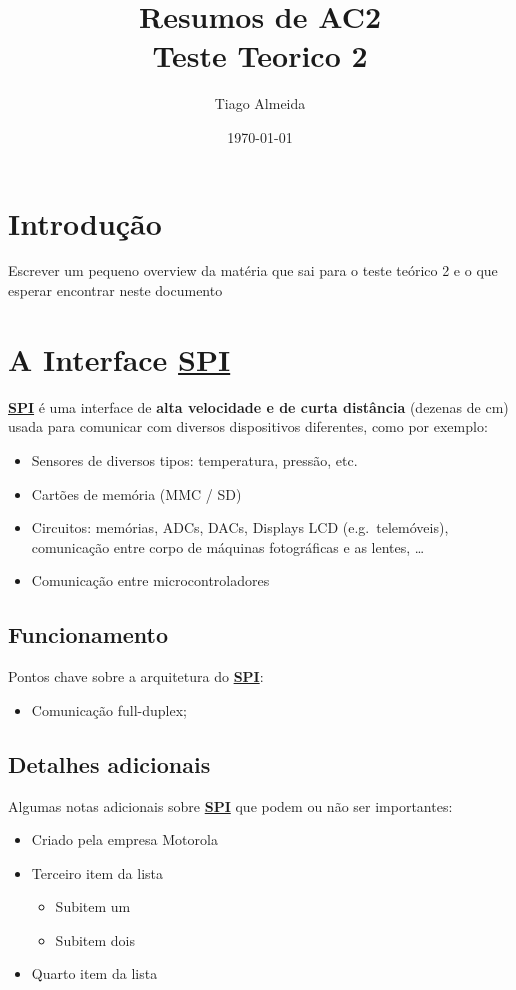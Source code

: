 \documentclass[a4paper, 11pt, onecolumn, twoside]{article}
\title{%
  Resumos de AC2 \\
  \large Teste Teorico 2}
\author{Tiago Almeida}
\date{\today}
\begin{document}
\maketitle

\tableofcontents

\section{Introdução}
Escrever um pequeno overview da matéria que sai para o teste teórico 2
e o que esperar encontrar neste documento

\section{A Interface \hyperref[sec:spi]{\textbf{\large{SPI}}}}
\hyperref[sec:spi]{\textbf{\large{SPI}}} é uma interface de \textbf{\large{alta velocidade e de curta distância}} (dezenas de cm) usada para comunicar com
diversos dispositivos diferentes, como por exemplo:
\begin{itemize}
    \item Sensores de diversos tipos: temperatura, pressão, etc.
    \item Cartões de memória (MMC / SD)
    \item Circuitos: memórias, ADCs, DACs, Displays LCD (e.g.\ telemóveis),
    comunicação entre corpo de máquinas fotográficas e as lentes, \ldots
    \item Comunicação entre microcontroladores
\end{itemize}

\subsection{Funcionamento}
Pontos chave sobre a arquitetura do \hyperref[sec:spi]{\textbf{\large{SPI}}}:\@
\begin{itemize}
    \item Comunicação full-duplex;
\end{itemize}

\subsection{Detalhes adicionais}
Algumas notas adicionais sobre \hyperref[sec:spi]{\textbf{\large{SPI}}} que podem ou não ser importantes:

\begin{itemize}
    \item Criado pela empresa Motorola
    \item Terceiro item da lista
    \begin{itemize}
        \item Subitem um
        \item Subitem dois
    \end{itemize}
    \item Quarto item da lista
\end{itemize}
\end{document}
